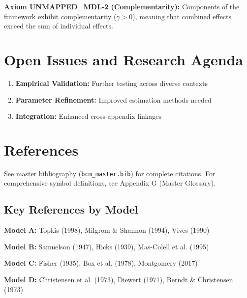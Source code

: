 \begin{tcolorbox}[colback=yellow!5!white,colframe=yellow!75!black,title=Axiom UNMAPPED_MDL-2: Complementarity]
\textbf{Axiom UNMAPPED_MDL-2 (Complementarity):}
Components of the framework exhibit complementarity ($\gamma > 0$), meaning
that combined effects exceed the sum of individual effects.
\end{tcolorbox}



\section{Open Issues and Research Agenda}
\label{sec:mdl-open}

\begin{enumerate}
    \item \textbf{Empirical Validation:} Further testing across diverse contexts
    \item \textbf{Parameter Refinement:} Improved estimation methods needed
    \item \textbf{Integration:} Enhanced cross-appendix linkages
\end{enumerate}

\section{References}
\label{sec:mdl-references}

\nocite{bcm_master}

See master bibliography (\texttt{bcm\_master.bib}) for complete citations.
For comprehensive symbol definitions, see Appendix G (Master Glossary).

\subsection{Key References by Model}

\textbf{Model A:} Topkis (1998), Milgrom \& Shannon (1994), Vives (1990)

\textbf{Model B:} Samuelson (1947), Hicks (1939), Mas-Colell et al. (1995)

\textbf{Model C:} Fisher (1935), Box et al. (1978), Montgomery (2017)

\textbf{Model D:} Christensen et al. (1973), Diewert (1971), Berndt \& Christensen (1973)

